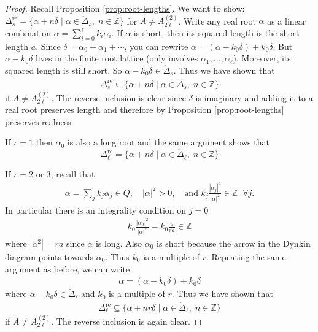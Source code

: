 \documentclass[12pt]{article}
\begin{document}
\begin{proof}
    Recall Proposition \ref{prop:root-lengths}. We want to show: $\Delta^{\mathrm{re}}_s = \{ \alpha+n\delta \mid \alpha \in \mathring{\Delta}_s, \; n\in\mathbb{Z}\}$ for $A\neq A_{2\ell}^{(2)}$. Write any real root $\alpha$ as a linear combination $\alpha=\sum_{i=0}^\ell k_i \alpha_i$. If $\alpha$ is short, then its squared length is the short length $a$. Since $\delta = \alpha_0+\alpha_1+\cdots$, you can rewrite $\alpha = (\alpha - k_0\delta) + k_0\delta$. But $\alpha - k_0\delta$ lives in the finite root lattice (only involves $\alpha_1,\dots,\alpha_\ell$). Moreover, its squared length is still short. So $\alpha - k_0\delta \in \mathring{\Delta}_s$. Thus we have shown that \begin{align*}
    \Delta^{\mathrm{re}}_s \subseteq \{ \alpha+n\delta \mid \alpha \in \mathring{\Delta}_s, \; n\in\mathbb{Z}\}
    \end{align*} if $A\neq A_{2\ell}^{(2)}$. The reverse inclusion is clear since $\delta$ is imaginary and adding it to a real root preserves length and therefore by Proposition \ref{prop:root-lengths} preserves realness.

    If $r=1$ then $\alpha_0$ is also a long root and the same argument shows that \[\Delta^{\mathrm{re}}_\ell = \{ \alpha+n\delta \mid \alpha \in \mathring{\Delta}_\ell, \; n\in\mathbb{Z}\}\]

    If $r = 2$ or $3$, recall that \begin{align*}
        \alpha = \sum_j k_j \alpha_j \in Q, \quad |\alpha|^2 > 0,
\quad \text{and } k_j\frac{|\alpha_j|^2}{|\alpha|^2} \in \mathbb{Z} \;\; \forall j.
    \end{align*} In particular there is an integrality condition on $j=0$ \begin{align*}
        k_0 \frac{|\alpha_0|^2}{|\alpha|^2} = k_0 \frac{a}{ra} \in \mathbb{Z}
    \end{align*} where $|\alpha^2| = ra$ since $\alpha$ is long. Also $\alpha_0$ is short because the arrow in the Dynkin diagram points towards $\alpha_0$.
    Thus $k_0$ is a multiple of $r$. Repeating the same argument as before, we can write \begin{align*}
        \alpha = (\alpha - k_0\delta) + k_0\delta
    \end{align*} where $\alpha - k_0\delta \in \mathring{\Delta}_\ell$ and $k_0$ is a multiple of $r$. Thus we have shown that \begin{align*}
        \Delta^{\mathrm{re}}_\ell \subseteq \{ \alpha+nr\delta \mid \alpha \in \mathring{\Delta}_\ell, \; n\in\mathbb{Z}\}
    \end{align*} if $A\neq A_{2\ell}^{(2)}$. The reverse inclusion is again clear.
\end{proof}
\end{document}
